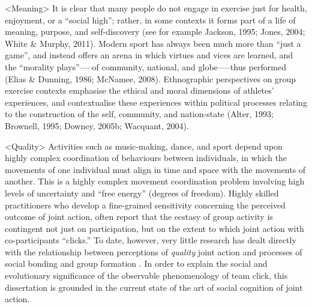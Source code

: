 <Meaning>
It is clear that many people do not engage in exercise just for health, enjoyment, or a ``social high''; rather, in some contexts it forms part of a life of meaning, purpose, and self-discovery (see for example Jackson, 1995; Jones, 2004; White \& Murphy, 2011). Modern sport has always been much more than ``just a game'', and instead offers an arena in which virtues and vices are learned, and the ``morality plays''—--of community, national, and globe—--thus performed (Elias \& Dunning, 1986; McNamee, 2008).  Ethnographic perspectives on group exercise contexts emphasise the ethical and moral dimensions of athletes’ experiences, and contextualise these experiences within political processes relating to the construction of the self, community, and nation-state (Alter, 1993; Brownell, 1995; Downey, 2005b; Wacquant, 2004).


<Quality>
Activities such as music-making, dance, and sport depend upon highly complex coordination of behaviours between individuals, in which the movements of one individual must align in time and space with the movements of another. This is a highly complex movement coordination problem involving high levels of uncertainty and ``free energy'' (degrees of freedom). Highly skilled practitioners who develop a fine-grained sensitivity concerning the perceived outcome of joint action, often report that the ecstasy of group activity is contingent not just on participation, but on the extent to which joint action with co-participants ``clicks.'' To date, however, very little research has dealt directly with the relationship between perceptions of \textit{quality} joint action and processes of social bonding and group formation \citep[but see][]{Marsh2009}.
In order to explain the social and evolutionary significance of the observable phenomenology of team click, this dissertation is grounded in the current state of the art of social cognition of joint action.


